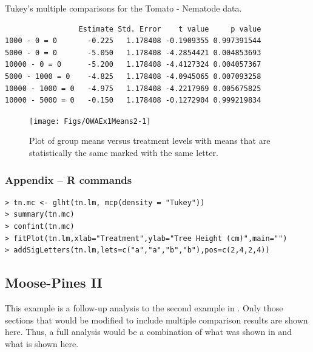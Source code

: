 \documentclass[10pt,openany]{book}\usepackage[]{graphicx}\usepackage[]{color}
\makeatletter
\newenvironment{kframe}{%
 \def\at@end@of@kframe{}%
 \ifinner\ifhmode%
  \def\at@end@of@kframe{\end{minipage}}%
  \begin{minipage}{\columnwidth}%
 \fi\fi%
 \def\FrameCommand##1{\hskip\@totalleftmargin \hskip-\fboxsep
 \colorbox{shadecolor}{##1}\hskip-\fboxsep
     \hskip-\linewidth \hskip-\@totalleftmargin \hskip\columnwidth}%
 \MakeFramed {\advance\hsize-\width
   \@totalleftmargin\z@ \linewidth\hsize
   \@setminipage}}%
 {\par\unskip\endMakeFramed%
 \at@end@of@kframe}
\newenvironment{knitrout}{}{} %
\makeatother
\begin{document}
\begin{table}[h]
  \centering
  \caption{Tukey's multiple comparisons for the Tomato - Nematode data.}\label{tab:OWAEx1HSD}
\begin{knitrout}
\color{fgcolor}\begin{kframe}
\begin{verbatim}
                 Estimate Std. Error    t value     p value
1000 - 0 = 0       -0.225   1.178408 -0.1909355 0.997391544
5000 - 0 = 0       -5.050   1.178408 -4.2854421 0.004853693
10000 - 0 = 0      -5.200   1.178408 -4.4127324 0.004057367
5000 - 1000 = 0    -4.825   1.178408 -4.0945065 0.007093258
10000 - 1000 = 0   -4.975   1.178408 -4.2217969 0.005675825
10000 - 5000 = 0   -0.150   1.178408 -0.1272904 0.999219834
\end{verbatim}
\end{kframe}
\end{knitrout}
\end{table}

\begin{knitrout}
\color{fgcolor}\begin{figure}[hbtp]

{\centering \texttt{[image: Figs/OWAEx1Means2-1]} 

}

\caption[Plot of group means versus treatment levels with means that are statistically the same marked with the same letter]{Plot of group means versus treatment levels with means that are statistically the same marked with the same letter.}\label{fig:OWAEx1Means2}
\end{figure}


\end{knitrout}

\subsubsection*{Appendix -- R commands}
\begin{Verbatim}[formatcom=\color{red},xleftmargin=5mm,commandchars=\\\{\}]
> tn.mc <- glht(tn.lm, mcp(density = "Tukey"))
> summary(tn.mc)
> confint(tn.mc)
> fitPlot(tn.lm,xlab="Treatment",ylab="Tree Height (cm)",main="")
> addSigLetters(tn.lm,lets=c("a","a","b","b"),pos=c(2,4,2,4))
\end{Verbatim}

\subsection{Moose-Pines II}
This example is a follow-up analysis to the second example in .  Only those sections that would be modified to include multiple comparison results are shown here.  Thus, a full analysis would be a combination of what was shown in  and what is shown here.
\end{document}
